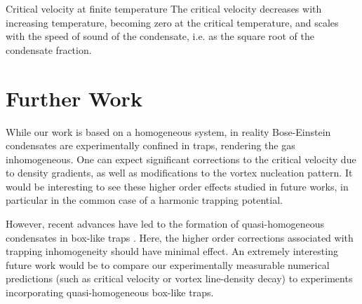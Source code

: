 \begin{chapter}{\label{cha:nonequib}Critical velocity at finite temperature}
The critical velocity decreases with increasing temperature, becoming zero at the critical temperature, and scales with the speed of sound of the condensate, i.e. as the square root of the condensate fraction.

\section{Further Work}
While our work is based on a homogeneous system, in reality Bose-Einstein condensates are experimentally confined in traps, rendering the gas inhomogeneous. One can expect significant corrections to the critical velocity due to density gradients, as well as modifications to the vortex nucleation pattern. It would be interesting to see these higher order effects studied in future works, in particular in the common case of a harmonic trapping potential.

However, recent advances have led to the formation of quasi-homogeneous condensates in box-like traps \cite{gaunt_2013,chomaz_2015}. Here, the higher order corrections associated with trapping inhomogeneity should have minimal effect. An extremely interesting future work would be to compare our experimentally measurable numerical predictions (such as critical velocity or vortex line-density decay) to experiments incorporating quasi-homogeneous box-like traps.
\end{chapter}